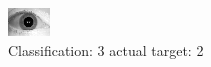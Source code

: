 \begin{figure}[h!]
\begin{center}
\includegraphics[width=0.60\columnwidth]{figures/ID1749_class_3_target_2.png}
\end{center}
\caption{ Classification: 3 actual target: 2}
\label{fig:ID1749_class_3_target_2}
\end{figure}
